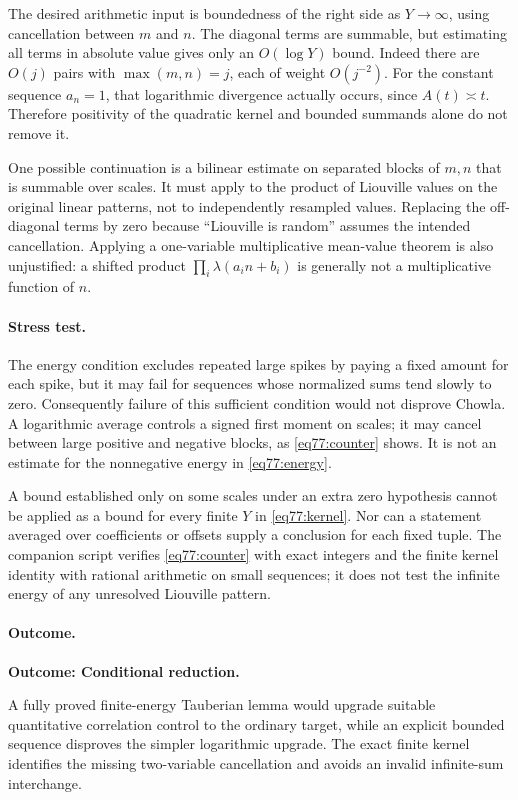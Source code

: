 \documentclass[11pt,a4paper]{article}
\numberwithin{equation}{section}
\begin{document}
The desired arithmetic input is boundedness of the right side as
$Y\to\infty$, using cancellation between $m$ and $n$.
The diagonal terms are summable, but estimating all terms in absolute
value gives only an $O(\log Y)$ bound. Indeed there are $O(j)$ pairs with
$\max(m,n)=j$, each of weight $O(j^{-2})$.
For the constant sequence $a_n=1$, that logarithmic divergence actually
occurs, since $A(t)\asymp t$. Therefore positivity of the quadratic kernel
and bounded summands alone do not remove it.

One possible continuation is a bilinear estimate on separated blocks of
$m,n$ that is summable over scales. It must apply to the product of
Liouville values on the original linear patterns, not to independently
resampled values. Replacing the off-diagonal terms by zero because
``Liouville is random'' assumes the intended cancellation. Applying a
one-variable multiplicative mean-value theorem is also unjustified: a
shifted product $\prod_i\lambda(a_i n+b_i)$ is generally not a
multiplicative function of $n$.

\paragraph{Stress test.}
The energy condition excludes repeated large spikes by paying a fixed
amount for each spike, but it may fail for sequences whose normalized
sums tend slowly to zero. Consequently failure of this sufficient condition
would not disprove Chowla. A logarithmic average controls a signed first
moment on scales; it may cancel between large positive and negative blocks,
as \eqref{eq77:counter} shows. It is not an estimate for the nonnegative
energy in \eqref{eq77:energy}.

A bound established only on some scales under an extra zero hypothesis
cannot be applied as a bound for every finite $Y$ in
\eqref{eq77:kernel}. Nor can a statement averaged over coefficients or
offsets supply a conclusion for each fixed tuple. The companion script
verifies \eqref{eq77:counter} with exact integers and the finite kernel
identity with rational arithmetic on small sequences; it does not test
the infinite energy of any unresolved Liouville pattern.

\paragraph{Outcome.}
\textbf{Outcome: Conditional reduction.}

A fully proved finite-energy Tauberian lemma would upgrade suitable
quantitative correlation control to the ordinary target, while an explicit
bounded sequence disproves the simpler logarithmic upgrade. The exact
finite kernel identifies the missing two-variable cancellation and avoids
an invalid infinite-sum interchange.
\end{document}
